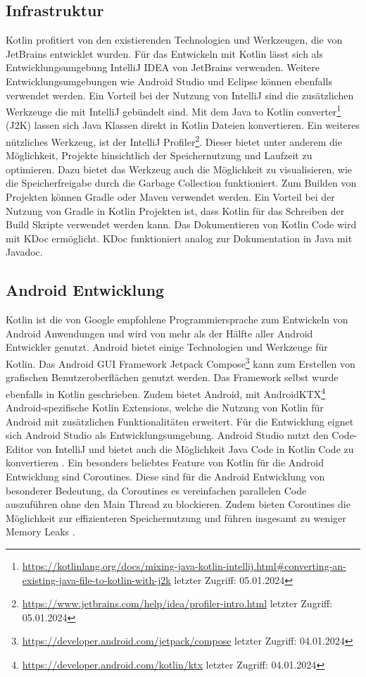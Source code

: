 \documentclass{article}
\begin{document}
\subsection{Infrastruktur}
Kotlin profitiert von den existierenden Technologien und Werkzeugen, die von JetBrains entwicklet wurden. Für das Entwickeln mit Kotlin lässt sich als Entwicklungsumgebung IntelliJ IDEA von JetBrains verwenden. Weitere Entwicklungsumgebungen wie Android Studio und Eclipse können ebenfalls verwendet werden. Ein Vorteil bei der Nutzung von IntelliJ sind die zusätzlichen Werkzeuge die mit IntelliJ gebündelt sind. Mit dem Java to Kotlin converter\footnote{\url{https://kotlinlang.org/docs/mixing-java-kotlin-intellij.html#converting-an-existing-java-file-to-kotlin-with-j2k} letzter Zugriff: 05.01.2024} (J2K) lassen sich Java Klassen direkt in Kotlin Dateien konvertieren. Ein weiteres nützliches Werkzeug, ist der IntelliJ Profiler\footnote{\url{https://www.jetbrains.com/help/idea/profiler-intro.html} letzter Zugriff: 05.01.2024}. Dieser bietet unter anderem die Möglichkeit, Projekte hinsichtlich der Speichernutzung und Laufzeit zu optimieren. Dazu bietet das Werkzeug auch die Möglichkeit zu visualisieren, wie die Speicherfreigabe durch die Garbage Collection funktioniert. \newline
Zum Builden von Projekten können Gradle oder Maven verwendet werden. Ein Vorteil bei der Nutzung von Gradle in Kotlin Projekten ist, dass Kotlin für das Schreiben der Build Skripte verwendet werden kann. Das Dokumentieren von Kotlin Code wird mit KDoc ermöglicht. KDoc funktioniert analog zur Dokumentation in Java mit Javadoc.

\subsection{Android Entwicklung}
Kotlin ist die von Google empfohlene Programmiersprache zum Entwickeln von Android Anwendungen und wird von mehr als der Hälfte aller Android Entwickler genutzt. Android bietet einige Technologien und Werkzeuge für Kotlin. Das Android GUI Framework Jetpack Compose\footnote{\url{https://developer.android.com/jetpack/compose} letzter Zugriff: 04.01.2024} kann zum Erstellen von grafischen Benutzeroberflächen genutzt werden. Das Framework selbst wurde ebenfalls in Kotlin geschrieben. Zudem bietet Android, mit AndroidKTX\footnote{\url{https://developer.android.com/kotlin/ktx} letzter Zugriff: 04.01.2024} Android-spezifische Kotlin Extensions, welche die Nutzung von Kotlin für Android mit zusätzlichen Funktionalitäten erweitert. Für die Entwicklung eignet sich Android Studio als Entwicklungsumgebung. Android Studio nutzt den Code-Editor von IntelliJ und bietet auch die Möglichkeit Java Code in Kotlin Code zu konvertieren \cite{AndroidKotlin}. \newline
Ein besonders beliebtes Feature von Kotlin für die Android Entwicklung sind Coroutines. Diese sind für die Android Entwicklung von besonderer Bedeutung, da Coroutines es vereinfachen parallelen Code auszuführen ohne den Main Thread zu blockieren. Zudem bieten Coroutines die Möglichkeit zur effizienteren Speichernutzung und führen insgesamt zu weniger Memory Leaks \cite{AndroidCoroutine}.
\end{document}

